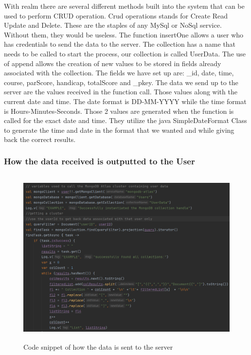 With realm there are several different methods built into the system that can be used to perform CRUD operation. Crud operations stands for Create Read Update and Delete. These are the staples of any MySql or NoSql service. Without them, they would be useless. The function insertOne allows a user who has credentials to send the data to the server.
\newline
The collection has a name that needs to be called to start the process, our collection is called UserData. The use of append allows the creation of new values to be stored in fields already associated with the collection. The fields we have set up are: \_id, date, time, course, parScore, handicap, totalScore and \_pkey. The data we send up to the server are the values received in the function call. Those values along with the current date and time. The date format is DD-MM-YYYY while the time format is Hours-Minutes-Seconds. Those 2 values are generated when the function is called for the exact date and time. They utilize the java SimpleDateFormat Class to generate the time and date in the format that we wanted and while giving back the correct results.
\subsubsection{How the data received is outputted to the User}
\begin{figure}[H]
    \centering
    \includegraphics[width=15cm, height = 9cm]{img/getMongoDBdata.PNG}
    \caption{Code snippet of how the data is sent to the server}
    \label{fig:altas config}
\end{figure}

